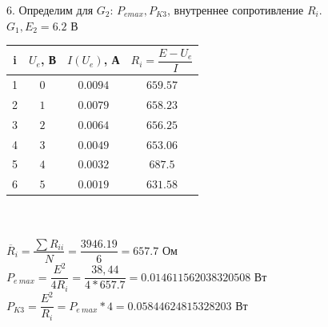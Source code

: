 6. Определим для $ G_2 $:
$ P_{e max}, P_{K3} $, внутреннее сопротивление $ R_i $.\\

$ G_1, E_2 = 6.2 $ В

\begin{tabular}{|c|c|c|c|}
    \hline
    i & $ U_e $, В & $ I(U_e) $, А & $ R_i = \dfrac{E - U_e}{I} $\\
    \hline
    1 & $ 0 $ & $ 0.0094 $ & $ 659.57 $\\
    \hline
    2 & $ 1 $ & $ 0.0079 $ & $ 658.23 $\\
    \hline
    3 & $ 2 $ & $ 0.0064 $ & $ 656.25 $\\
    \hline
    4 & $ 3 $ & $ 0.0049 $ & $ 653.06 $\\
    \hline
    5 & $ 4 $ & $ 0.0032 $ & $ 687.5 $\\
    \hline
    6 & $ 5 $ & $ 0.0019 $ & $ 631.58 $\\
    \hline
\end{tabular}
\\
\\

$ \overline R_i = 
\dfrac{\sum R_{i i}}{N} = 
\dfrac{3946.19}{6} = 
657.7
$ Ом
\\

$ P_{e\ max} = 
\dfrac{E^2}{4R_i} = 
\dfrac{38,44}{4 * 657.7} = 
0.014611562038320508
$ Вт
\\

$ P_{K3} = 
\dfrac{E^2}{R_i} = 
P_{e\ max} * 4 = 
0.05844624815328203
$ Вт
\\

